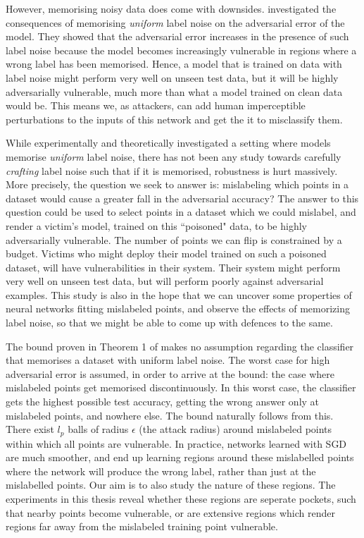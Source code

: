 \documentclass{ociamthesis}
\begin{document}
However, memorising noisy data does come with downsides. \citet{sanyal2021how}
investigated the consequences of memorising \emph{uniform} label noise on the
adversarial error of the model. They showed that the adversarial error increases
in the presence of such label noise because the model becomes increasingly
vulnerable in regions where a wrong label has been memorised. Hence, a model
that is trained on data with label noise might perform very well on unseen test
data, but it will be highly adversarially vulnerable, much more than what a
model trained on clean data would be. This means we, as attackers, can add human
imperceptible perturbations to the inputs of this network and get the it to
misclassify them.

While \citet{sanyal2021how} experimentally and theoretically investigated a
setting where models memorise \emph{uniform} label noise, there has not been any
study towards carefully \emph{crafting} label noise such that if it is
memorised, robustness is hurt massively. More precisely, the question we seek to
answer is: mislabeling which points in a dataset would cause a greater fall in
the adversarial accuracy? The answer to this question could be used to select
points in a dataset which we could mislabel, and render a victim's model,
trained on this ``poisoned" data, to be highly adversarially vulnerable. The
number of points we can flip is constrained by a budget. Victims who might
deploy their model trained on such a poisoned dataset, will have vulnerabilities
in their system. Their system might perform very well on unseen test data, but
will perform poorly against adversarial examples. This study is also in the hope
that we can uncover some properties of neural networks fitting mislabeled
points, and observe the effects of memorizing label noise, so that we might be
able to come up with defences to the same.

The bound proven in Theorem 1 of \citet{sanyal2021how} makes no assumption
regarding the classifier that memorises a dataset with uniform label noise. The
worst case for high adversarial error is assumed, in order to arrive at the
bound: the case where mislabeled points get memorised discontinuously. In this
worst case, the classifier gets the highest possible test accuracy, getting the
wrong answer only at mislabeled points, and nowhere else. The bound naturally
follows from this. There exist $l_p$ balls of radius $\epsilon$ (the attack
radius) around mislabeled points within which all points are vulnerable. In
practice, networks learned with SGD are much smoother, and end up learning
regions around these mislabelled points where the network will produce the wrong
label, rather than just at the mislabelled points. Our aim is to also study the
nature of these regions. The experiments in this thesis reveal whether these
regions are seperate pockets, such that nearby points become vulnerable, or are
extensive regions which render regions far away from the mislabeled training
point vulnerable.
\end{document}

